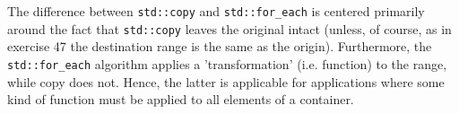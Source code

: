 The difference between \texttt{std::copy} and \texttt{std::for_each} is centered primarily around the fact that \texttt{std::copy} leaves the original intact (unless, of course, as in exercise 47 the destination range is the same as the origin). Furthermore, the \texttt{std::for_each} algorithm applies a 'transformation' (i.e. function) to the range, while copy does not. Hence, the latter is applicable for applications where some kind of function must be applied to all elements of a container.
